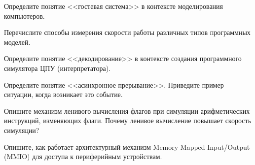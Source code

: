 \documentclass[a4paper, addpoints]{exam}
\begin{document}
\begin{questions}



\question[2] Определите понятие <<гостевая система>> в контексте моделирования компьютеров.
\begin{solution}[2cm]
\end{solution}

\question[2] Перечислите способы измерения скорости работы различных типов программных моделей.
\begin{solution}[2cm]
\end{solution}

\question[2] Определите понятие <<декодирование>> в контексте создания программного симулятора ЦПУ (интерпретатора).
\begin{solution}[2cm]
\end{solution}

\question[2] Определите понятие <<асинхронное прерывание>>. Приведите пример ситуации, когда возникает это событие.
\begin{solution}[2cm]
\end{solution}

\question[2] Опишите механизм ленивого вычисления флагов при симуляции арифметических инструкций, изменяющих флаги. Почему ленивое вычисление повышает скорость симуляции?
\begin{solution}[2cm]
\end{solution}

\question[2] Опишите, как работает архитектурный механизм Memory Mapped Input/Output (MMIO) для доступа к периферийным устройствам.
\begin{solution}[2cm]
\end{solution}


\end{questions}
\end{document}
